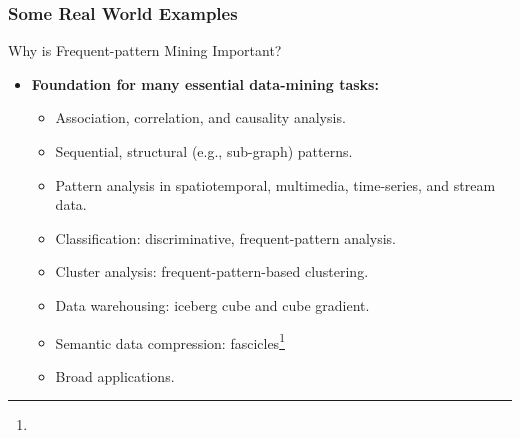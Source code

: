 \begin{frame}
	\frametitle{Some Real World Examples}

	\begin{center}
	\end{center}

	\vspace{-2.15cm}

\end{frame}

\begin{frame}{Why is Frequent-pattern Mining Important?}
	\begin{itemize}
		\item \textbf{Foundation for many essential data-mining tasks:}
		      \begin{itemize}
			      \item Association, correlation, and causality analysis.
			      \item Sequential, structural (e.g., sub-graph) patterns.
			      \item Pattern analysis in spatiotemporal, multimedia, time-series,
			            and stream data.
			      \item Classification: discriminative, frequent-pattern analysis.
			      \item Cluster analysis: frequent-pattern-based clustering.
			      \item Data warehousing: iceberg cube and cube gradient.
			      \item Semantic data compression: fascicles\footnote{}
			      \item Broad applications.
		      \end{itemize}
	\end{itemize}
\end{frame}

